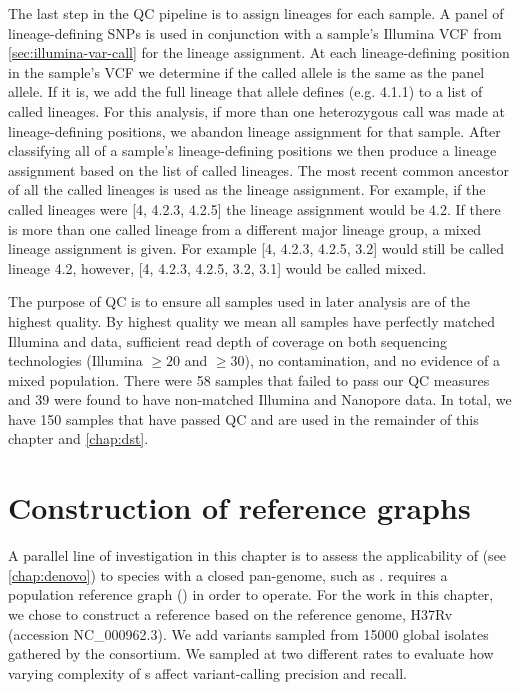 The last step in the QC pipeline is to assign lineages for each sample. A panel of lineage-defining SNPs \cite{Shitikov2017,Rutaihwa2019,stucki2016} is used in conjunction with a sample's Illumina VCF from \autoref{sec:illumina-var-call} for the lineage assignment. At each lineage-defining position in the sample's VCF we determine if the called allele is the same as the panel allele. If it is, we add the full lineage that allele defines (e.g. 4.1.1) to a list of called lineages. For this analysis, if more than one heterozygous call was made at lineage-defining positions, we abandon lineage assignment for that sample. After classifying all of a sample's lineage-defining positions we then produce a lineage assignment based on the list of called lineages. The most recent common ancestor of all the called lineages is used as the lineage assignment. For example, if the called lineages were [4, 4.2.3, 4.2.5] the lineage assignment would be 4.2. If there is more than one called lineage from a different major lineage group, a mixed lineage assignment is given. For example [4, 4.2.3, 4.2.5, 3.2] would still be called lineage 4.2, however, [4, 4.2.3, 4.2.5, 3.2, 3.1] would be called mixed.

The purpose of QC is to ensure all samples used in later analysis are of the highest quality. By highest quality we mean all samples have perfectly matched Illumina and \ont{} data, sufficient read depth of coverage on both sequencing technologies (Illumina $\ge 20$ and \ont{} $\ge 30$), no contamination, and no evidence of a mixed \mtb{} population. 
There were 58 samples that failed to pass our QC measures and 39 were found to have non-matched Illumina and Nanopore data. In total, we have 150 samples that have passed QC and are used in the remainder of this chapter and \autoref{chap:dst}.


\section{Construction of \mtb{} reference graphs}
\label{sec:tbprg}
 A parallel line of investigation in this chapter is to assess the applicability of \pandora{} (see \autoref{chap:denovo}) to species with a closed pan-genome, such as \mtb{}.
\pandora{} requires a population reference graph (\prg{}) in order to operate. For the work in this chapter, we chose to construct a reference \prg{} based on the \mtb{} reference genome, H37Rv (accession NC\_000962.3). We add variants sampled from 15000 global \mtb{} isolates gathered by the \cryptic{} consortium. We sampled at two different rates to evaluate how varying complexity of \prg{}s affect variant-calling precision and recall.

